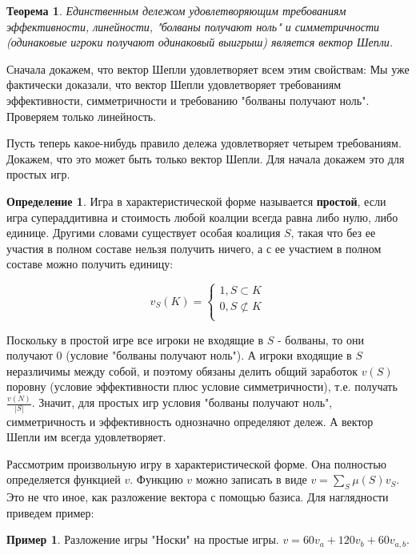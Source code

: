 \documentclass[pdftex,12pt,a4paper]{article}
\numberwithin{equation}{page} %
\newtheorem{theorem}[equation]{Теорема} %
\theoremstyle{definition} %
\newtheorem{definition}[equation]{Определение}
\theoremstyle{definition}
\newtheorem{myex}[equation]{Пример}
\theoremstyle{definition}
\begin{document}
\begin{theorem}
Единственным дележом удовлетворяющим требованиям эффективности, линейности, "болваны получают ноль" и симметричности (одинаковые игроки получают одинаковый выигрыш) является вектор Шепли.
\end{theorem}
Сначала докажем, что вектор Шепли удовлетворяет всем этим свойствам:
Мы уже фактически доказали, что вектор Шепли удовлетворяет требованиям эффективности, симметричности и требованию "болваны получают ноль". Проверяем только линейность.

Пусть теперь какое-нибудь правило дележа удовлетворяет четырем требованиям. Докажем, что это может быть только вектор Шепли.
Для начала докажем это для простых игр.

\begin{definition}
Игра в характеристической форме называется \textbf{простой}, если игра супераддитивна и стоимость любой коалции всегда равна либо нулю, либо единице. Другими словами существует особая коалиция $S$, такая что без ее участия в полном составе нельзя получить ничего, а с ее участием в полном составе можно получить единицу:

\begin{equation}
v_{S}(K)=
\begin{cases} 
1, S\subset K \\  
0, S\not \subset K \\
\end{cases}
\end{equation}

\end{definition}

Поскольку в простой игре все игроки не входящие в $S$ - болваны, то они получают 0 (условие "болваны получают ноль"). А игроки входящие в $S$ неразличимы между собой, и поэтому обязаны делить общий заработок $v(S)$ поровну (условие эффективности плюс условие симметричности), т.е. получать $\frac{v(N)}{|S|}$.
Значит, для простых игр условия "болваны получают ноль", симметричность и эффективность однозначно определяют дележ. А вектор Шепли им всегда удовлетворяет.

Рассмотрим произвольную игру в характеристической форме. Она полностью определяется функцией $v$. Функцию $v$ можно записать в виде $v=\sum_{S}\mu(S)v_{S}$. Это не что иное, как разложение вектора с помощью базиса. Для наглядности приведем пример:

\begin{myex}
Разложение игры "Носки" на простые игры. $v=60v_{a}+120v_{b}+60v_{a,b}$.
\end{myex}
\end{document}
